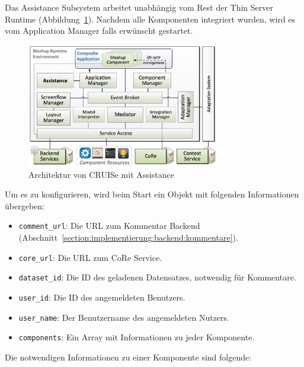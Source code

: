 \documentclass[
	headsepline,
	footsepline,
	fontsize=12pt,
	bibliography=totoc
]{scrbook}
\begin{document}
Das Assistance Subsystem arbeitet unabhängig vom Rest der Thin Server Runtime (Abbildung~\ref{figure:cruise-architektur-assistance}). Nachdem alle Komponenten integriert wurden, wird es vom Application Manager falls erwünscht gestartet.

\begin{figure}[htbp]
   \centering
   \includegraphics[width=0.75\textwidth]{images/implementierung-cruise-architektur.png}
   \caption{Architektur von CRUISe mit Assistance}
   \label{figure:cruise-architektur-assistance}
\end{figure}

Um es zu konfigurieren, wird beim Start ein Objekt mit folgenden Informationen übergeben:

\begin{itemize}
	\item \texttt{comment\_url}: Die URL zum Kommentar Backend (Abschnitt~\ref{section:implementierung:backend:kommentare}).
	\item \texttt{core\_url}: Die URL zum CoRe Service.
	\item \texttt{dataset\_id}: Die ID des geladenen Datensatzes, notwendig für Kommentare.
	\item \texttt{user\_id}: Die ID des angemeldeten Benutzers.
	\item \texttt{user\_name}: Der Benutzername des angemeldeten Nutzers.
	\item \texttt{components}: Ein Array mit Informationen zu jeder Komponente.
\end{itemize}

Die notwendigen Informationen zu einer Komponente sind folgende:
\end{document}
